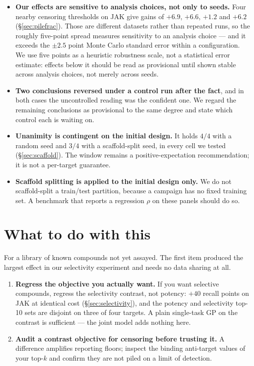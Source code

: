 \documentclass[11pt]{article}
\begin{document}
\begin{itemize}[leftmargin=1.6em,itemsep=0.2em]
    about these blocks at these sizes.
  \item \textbf{Our effects are sensitive to analysis choices, not only to
    seeds.} Four nearby censoring thresholds on JAK give gains of $+6.9$,
    $+6.6$, $+1.2$ and $+6.2$ (\S\ref{sec:pilefrac}). Those are different
    datasets rather than repeated runs, so the roughly five-point spread
    measures sensitivity to an analysis choice --- and it exceeds the
    $\pm 2.5$ point Monte Carlo standard error within a configuration. We use
    five points as a heuristic robustness scale, not a statistical error
    estimate: effects below it should be read as provisional until shown
    stable across analysis choices, not merely across seeds.
  \item \textbf{Two conclusions reversed under a control run after the fact},
    and in both cases the uncontrolled reading was the confident one. We regard
    the remaining conclusions as provisional to the same degree and state which
    control each is waiting on.
  \item \textbf{Unanimity is contingent on the initial design.} It holds $4/4$
    with a random seed and $3/4$ with a scaffold-split seed, in every cell we
    tested (\S\ref{sec:scaffold}). The window remains a positive-expectation
    recommendation; it is not a per-target guarantee.
  \item \textbf{Scaffold splitting is applied to the initial design only.} We do
    not scaffold-split a train/test partition, because a campaign has no fixed
    training set. A benchmark that reports a regression $\rho$ on these panels
    should do so.
\end{itemize}

\section{What to do with this}
\label{sec:guidance}

For a library of known compounds not yet assayed. The first item produced the largest effect in our selectivity experiment and
needs no data sharing at all.

\begin{enumerate}[leftmargin=1.6em,itemsep=0.2em]
  \item \textbf{Regress the objective you actually want.} If you want selective
    compounds, regress the selectivity contrast, not potency: $+40$ recall
    points on JAK at identical cost (\S\ref{sec:selectivity}), and the potency
    and selectivity top-10 sets are disjoint on three of four targets. A plain
    single-task GP on the contrast is sufficient --- the joint model
    adds nothing here.
  \item \textbf{Audit a contrast objective for censoring before trusting it.}
    A difference amplifies reporting floors; inspect the binding anti-target
    values of your top-$k$ and confirm they are not piled on a limit of
    detection.
\end{enumerate}
\end{document}
